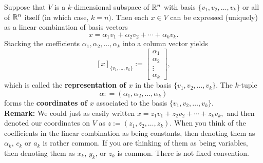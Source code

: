 \begin{tcolorbox}[sharp corners, colback=green!30, colframe=green!80!blue, title=\textbf{\Large Vector Space Coordinates and Vector Representation}]
Suppose that $V$ is a $k$-dimensional subspace of $\mathbb R^n$ with basis $\{ v_1, v_2, \ldots, v_k\}$ or all of $\mathbb R^n$ itself (in which case, $k=n)$. Then each $x\in V$ can be expressed (uniquely) as a linear combination of basis vectors
\begin{equation}
    \label{eq:CoordinateExpansion}
    x = \alpha_1 v_1 + \alpha_2 v_2 + \cdots + \alpha_k v_k.
\end{equation}
Stacking the coefficients $\alpha_1 ,  \alpha_2,  \ldots,  \alpha_k$ into a column vector yields
\begin{equation}
    \label{eq:VectorRepresentation}
    [x]_{\{ v_1, \ldots, v_k\}} := \begin{bmatrix} \alpha_1 \\ \alpha_2 \\ \vdots \\ \alpha_k \end{bmatrix},
\end{equation}
which is called the \textbf{representation of $x$} in the basis $\{ v_1, v_2, \ldots, v_k\}$. The $k$-tuple 
 \begin{equation}
    \label{eq:Coordinates}
    \alpha: = \left(\alpha_1 ,  \alpha_2,  \ldots,  \alpha_k \right)
\end{equation}
forms the \textbf{coordinates of $x$} associated to the basis $\{ v_1, v_2, \ldots, v_k\}$. \\
\textbf{Remark:} We could just as easily written $ x = z_1 v_1 + z_2 v_2 + \cdots + z_k v_k,$ and then denoted our coordinates on $V$ as $z:=\left(z_1, z_2, \ldots, z_k  \right)$.
When you think of the coefficients in the linear combination as being constants, then denoting them as $\alpha_k$, $c_k$ or $a_k$ is rather common. If you are thinking of them as being variables, then denoting them as $x_k$, $y_k$, or $z_k$ is common. There is not fixed convention. 
\end{tcolorbox}



